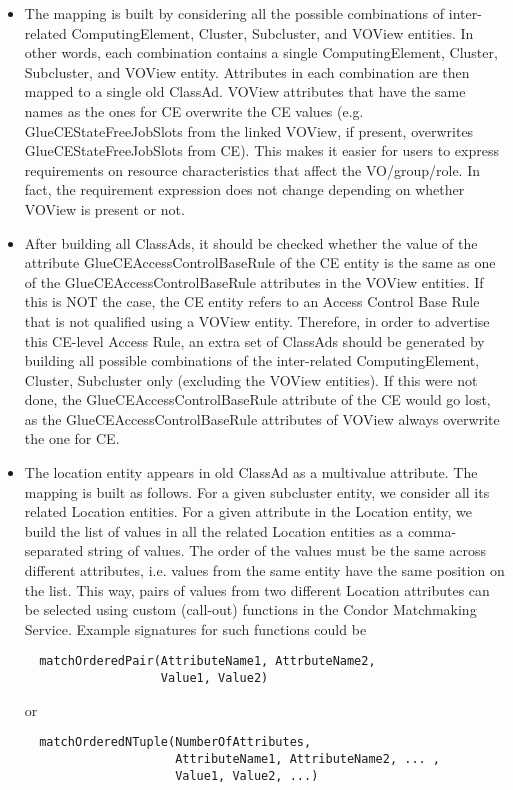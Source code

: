 \documentclass[12pt]{article}
\begin{document}
\begin{itemize}

\item The mapping is built by considering all the possible combinations of
inter-related ComputingElement, Cluster, Subcluster, and VOView
entities. In other words, each combination contains a single
ComputingElement, Cluster, Subcluster, and VOView entity. Attributes
in each combination are then mapped to a single old ClassAd. VOView
attributes that have the same names as the ones for CE overwrite the
CE values (e.g. GlueCEStateFreeJobSlots from the linked VOView, if
present, overwrites GlueCEStateFreeJobSlots from CE). This makes it
easier for users to express requirements on resource characteristics
that affect the VO/group/role. In fact, the requirement expression
does not change depending on whether VOView is present or not.

\item After building all ClassAds, it should be checked whether the value of 
the attribute GlueCEAccessControlBaseRule of the CE entity is the same as
one of the GlueCEAccessControlBaseRule attributes in the 
VOView entities. If this is NOT the case, the CE entity refers to an 
Access Control Base Rule that is not qualified using a VOView entity.
Therefore, in order to advertise this CE-level Access Rule, an extra set
of ClassAds should be generated by building all possible combinations of the
inter-related ComputingElement, Cluster, Subcluster only (excluding 
the VOView entities). If this were not done, the GlueCEAccessControlBaseRule
attribute of the CE would go lost, as the GlueCEAccessControlBaseRule
attributes of VOView always overwrite the one for CE.

\item The location entity appears in old ClassAd as a multivalue attribute.
The mapping is built as follows. For a given subcluster entity, we
consider all its related Location entities. For a given attribute in
the Location entity, we build the list of values in all the related
Location entities as a comma-separated string of values. The order
of the values must be the same across different attributes, i.e.
values from the same entity have the same position on the list. This
way, pairs of values from two different Location attributes can be
selected using custom (call-out) functions in the Condor Matchmaking
Service. Example signatures for such functions could be

\begin{verbatim}
  matchOrderedPair(AttributeName1, AttrbuteName2,
                   Value1, Value2)
\end{verbatim}
    or
\begin{verbatim}
  matchOrderedNTuple(NumberOfAttributes,
                     AttributeName1, AttributeName2, ... ,
                     Value1, Value2, ...)
\end{verbatim}


\end{itemize}
\end{document}
